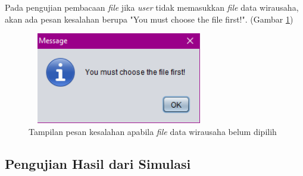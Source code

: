Pada pengujian pembacaan \textit{file} jika \textit{user} tidak memasukkan \textit{file} data wirausaha, akan ada pesan kesalahan berupa "You must choose the file first!". (Gambar \ref{pesanError6})

	\begin{figure} [H]
	\centering  
	\includegraphics[width=8cm, height=4cm]{pesanError6} 
		\caption[Tampilan pesan kesalahan apabila \textit{file} data wirausaha belum dipilih]{Tampilan pesan kesalahan apabila \textit{file} data wirausaha belum dipilih}
	\label{pesanError6} 
\end{figure}

 
\subsection{Pengujian Hasil dari Simulasi}

